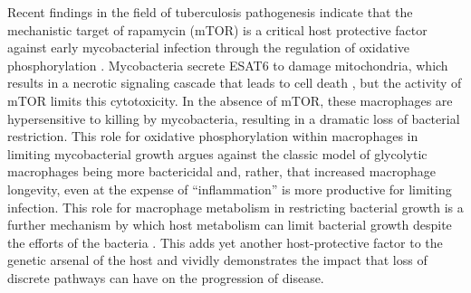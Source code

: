 Recent findings in the field of tuberculosis pathogenesis indicate that the mechanistic target of rapamycin (mTOR) is a critical host protective factor against early mycobacterial infection through the regulation of oxidative phosphorylation \citep{Pagan2022}. Mycobacteria secrete ESAT6 to damage mitochondria, which results in a necrotic signaling cascade that leads to cell death \citep{Roca2019}, but the activity of mTOR limits this cytotoxicity. In the absence of mTOR, these macrophages are hypersensitive to killing by mycobacteria, resulting in a dramatic loss of bacterial restriction. This role for oxidative phosphorylation within macrophages in limiting mycobacterial growth argues against the classic model of glycolytic macrophages being more bactericidal and, rather, that increased macrophage longevity, even at the expense of ``inflammation'' is more productive for limiting infection. This role for macrophage metabolism in restricting bacterial growth is a further mechanism by which host metabolism can limit bacterial growth despite the efforts of the bacteria \citep{Pernas2021}. This adds yet another host-protective factor to the genetic arsenal of the host and vividly demonstrates the impact that loss of discrete pathways can have on the progression of disease. 

